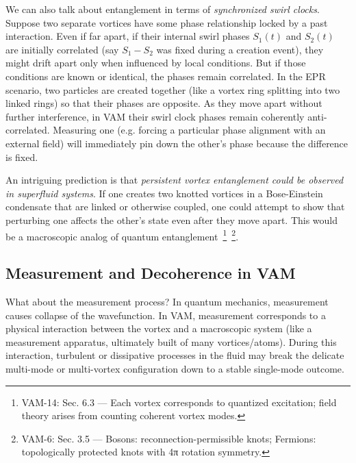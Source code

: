 \documentclass[a4paper,12pt]{article}
\begin{document}
    We can also talk about entanglement in terms of \emph{synchronized swirl clocks}. Suppose two separate vortices have some phase relationship locked by a past interaction. Even if far apart, if their internal swirl phases $S_1(t)$ and $S_2(t)$ are initially correlated (say $S_1 - S_2$ was fixed during a creation event), they might drift apart only when influenced by local conditions. But if those conditions are known or identical, the phases remain correlated. In the EPR scenario, two particles are created together (like a vortex ring splitting into two linked rings) so that their phases are opposite. As they move apart without further interference, in VAM their swirl clock phases remain coherently anti-correlated. Measuring one (e.g. forcing a particular phase alignment with an external field) will immediately pin down the other’s phase because the difference is fixed.

    An intriguing prediction is that \emph{persistent vortex entanglement could be observed in superfluid systems}. If one creates two knotted vortices in a Bose-Einstein condensate that are linked or otherwise coupled, one could attempt to show that perturbing one affects the other’s state even after they move apart. This would be a macroscopic analog of quantum entanglement~\footnote{VAM-14: Sec. 6.3 — Each vortex corresponds to quantized excitation; field theory arises from counting coherent vortex modes.}~\footnote{VAM-6: Sec. 3.5 — Bosons: reconnection-permissible knots; Fermions: topologically protected knots with 4π rotation symmetry.}.

    \subsection{Measurement and Decoherence in VAM}
    What about the measurement process? In quantum mechanics, measurement causes collapse of the wavefunction. In VAM, measurement corresponds to a physical interaction between the vortex and a macroscopic system (like a measurement apparatus, ultimately built of many vortices/atoms). During this interaction, turbulent or dissipative processes in the fluid may break the delicate multi-mode or multi-vortex configuration down to a stable single-mode outcome.
\end{document}
